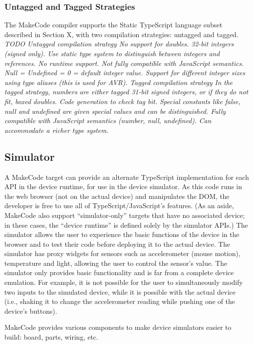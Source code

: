 \subsubsection{Untagged and Tagged Strategies}

The MakeCode compiler supports the Static TypeScript language subset described in Section X, with two compilation
strategies: untagged and tagged. 
\emph{TODO
Untagged compilation strategy
No support for doubles. 32-bit integers (signed only). Use static type system to distinguish between integers and references.
No runtime support.  Not fully compatible with JavaScript semantics. Null = Undefined = 0 = default integer value.  Support for
different integer sizes using type aliases (this is used for AVR). 
Tagged compilation strategy
In the tagged strategy, numbers are either tagged 31-bit signed integers, or if they do not fit, boxed doubles. Code generation
to check tag bit. Special constants like false, null and undefined are given special values and can be distinguished. Fully
compatible with JavaScript semantics (number, null, undefined).   Can accommodate a richer type system.}

\subsection{Simulator}

A MakeCode target can provide an alternate TypeScript implementation for each API in the device runtime, for use in the device
simulator. As this code runs in the web browser (not on the actual device) and manipulates the DOM, the developer is free to
use all of TypeScript/JavaScript's features. (As an aside, MakeCode also support ``simulator-only'' targets that have no 
associated device; in these cases, the ``device runtime'' is defined solely by the simulator APIs.) 
The simulator allows the user to experience the basic functions of the device in the browser and to test their code
before deploying it to the actual device. The simulator has proxy widgets for sensors such as accelerometer (mouse motion),
temperature and light, allowing the user to control the sensor's value.  The simulator only provides basic functionality
and is far from a complete device emulation.   For example, it is not possible for the user to simultaneously modify two
inputs to the simulated device, while it is possible with the actual device (i.e., shaking it to change the accelerometer
reading while pushing one of the device's buttons).

MakeCode provides various components to make device simulators easier to build: board, parts, wiring, etc.

